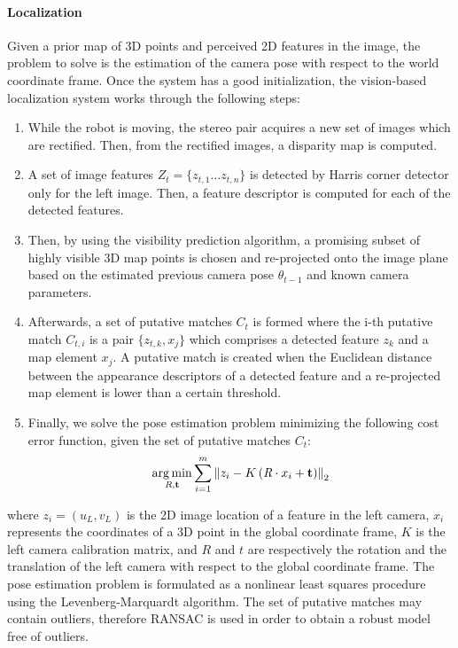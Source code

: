 \paragraph{Localization}
Given a prior map of 3D points and perceived 2D features in the image, the problem to solve is the estimation of the camera pose with respect to the world coordinate frame. Once the system has a good initialization, the vision-based localization system works through the
following steps:
%
\begin{enumerate}
\item While the robot is moving, the stereo pair acquires a new set of images which are rectified. Then, from the rectified images, a disparity map is computed.
\item A set of image features $Z_{t}=\{z_{t,1} \ldots z_{t,n}\}$ is detected by Harris corner detector only for the left image. Then, a feature descriptor is computed for each of the detected features.
\item Then, by using the visibility prediction algorithm, a promising subset of highly visible 3D map points is chosen and re-projected onto the image plane based on the estimated previous camera pose $\theta_{t-1}$ and known camera parameters.
\item Afterwards, a set of putative matches $C_{t}$ is formed where the i-th putative match $C_{t,i}$ is a pair $\{z_{t,k},x_{j}\}$ which comprises a detected feature $z_{k}$ and a map element $x_{j}$. A putative match is created when the Euclidean distance between the appearance descriptors of a detected feature and a re-projected map element is lower than a certain threshold.
\item Finally, we solve the pose estimation problem minimizing the following cost error function, given the set of putative matches $C_{t}$:
%
\begin{equation} \label{eq:pose_estimation}
\argmin \limits_{\emph{R},\mathbf{t}} \sum \limits_{i=1}^{m} \left\|z_{i} - K \left(\emph{R}\cdot x_{i} + \mathbf{t} \right)\right\|_{2}
\end{equation}
%
\end{enumerate}
%
where $z_{i}=\left(u_{L},v_{L}\right)$ is the 2D image location of a feature in the left camera, $x_{i}$ represents the coordinates of a 3D point in the global coordinate frame, $K$ is the left camera calibration matrix, and $R$ and $t$ are respectively the rotation and the translation of the left camera with respect to the global coordinate frame. The pose estimation problem is formulated as a nonlinear least squares procedure using the Levenberg-Marquardt algorithm. The set of putative matches may contain outliers, therefore RANSAC is used in order to obtain a robust model free of outliers.


